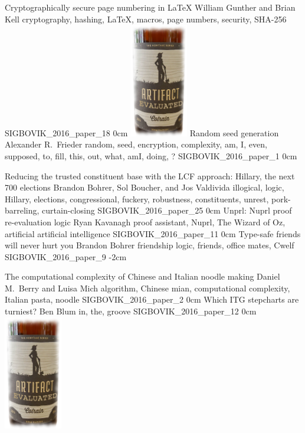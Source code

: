 
\addpaper
	{Cryptographically secure page numbering in \LaTeX}
	{William Gunther and Brian Kell}
	{cryptography, hashing, LaTeX, macros, page numbers, security, SHA-256}
	{SIGBOVIK_2016_paper_18}
	{0cm}
	{\includegraphics[width=1in]{eval}}
\addpaper
	{Random seed generation}
	{Alexander R.\ Frieder}
	{random, seed, encryption, complexity, am, I, even, supposed, to, fill, this, out, what, amI, doing, ?}
	{SIGBOVIK_2016_paper_1}
	{0cm}
	{}

\addpaper
	{Reducing the trusted constituent base with the LCF approach: Hillary, the next 700 elections}
	{Brandon Bohrer, Sol Boucher, and Jos Valdivida}
	{illogical, logic, Hillary, elections, congressional, fuckery, robustness, constituents, unrest, pork-barreling, curtain-closing}
	{SIGBOVIK_2016_paper_25}
	{0cm}
	{}
\addpaper
	{Unprl: Nuprl proof re-evaluation logic}
	{Ryan Kavanagh}
	{proof assistant, Nuprl, The Wizard of Oz, artificial artificial intelligence}
	{SIGBOVIK_2016_paper_11}
	{0cm}
	{}
\addpaper
	{Type-safe friends will never hurt you}
	{Brandon Bohrer}
	{friendship logic, friends, office mates, Cwelf}
	{SIGBOVIK_2016_paper_9}
	{-2cm}
	{}

\addpaper
	{The computational complexity of Chinese and Italian noodle making}
	{Daniel M.\ Berry and Luisa Mich}
	{algorithm, Chinese mian, computational complexity, Italian pasta, noodle}
	{SIGBOVIK_2016_paper_2}
	{0cm}
	{}
\addpaper
	{Which ITG stepcharts are turniest?}
	{Ben Blum}
	{in, the, groove}
	{SIGBOVIK_2016_paper_12}
	{0cm}
	{\includegraphics[width=1in]{eval}}

